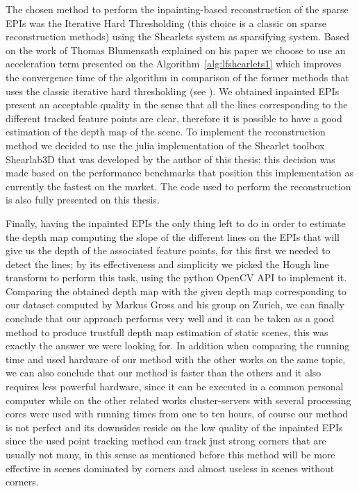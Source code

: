 \bigskip

The chosen method to perform the inpainting-based reconstruction of the sparse EPIs was the Iterative Hard Thresholding (this choice is a classic on sparse reconstruction methods) using the Shearlets system as sparsifying system. Based on the work of Thomas Blumensath explained on his paper \cite{hard-thresholding} we choose to use an acceleration term presented on the Algorithm~\ref{alg:lfshearlets1} which improves the convergence time of the algorithm in comparison of the former methods that uses the classic iterative hard thresholding (see \cite{clustered-inpainting}). We obtained inpainted EPIs present an acceptable quality in the sense that all the lines corresponding to the different tracked feature points are clear, therefore it is possible to have a good estimation of the depth map of the scene. To implement the reconstruction method we decided to use the julia implementation of the Shearlet toolbox Shearlab3D that was developed by the author of this thesis; this decision was made based on the performance benchmarks that position this implementation as currently the fastest on the market. The code used to perform the reconstruction is also fully presented on this thesis.

\bigskip

Finally, having the inpainted EPIs the only thing left to do in order to estimate the depth map computing the slope of the different lines on the EPIs that will give us the depth of the associated feature points, for this first we needed to detect the lines; by its effectiveness and simplicity we picked the Hough line transform to perform this task, using the python OpenCV API to implement it. Comparing the obtained depth map with the given depth map corresponding to our dataset computed by Markus Gross and his group on Zurich, we can finally conclude that our approach performs very well and it can be taken as a good method to produce trustfull depth map estimation of static scenes, this was exactly the answer we were looking for. In addition when comparing the running time and used hardware of our method with the other works on the same topic, we can also conclude that our method is faster than the others and it also requires less powerful hardware, since it can be executed in a common personal computer while on the other related works cluster-servers with several processing cores were used with running times from one to ten hours, of course our method is not perfect and its downsides reside on the low quality of the inpainted EPIs since the used point tracking method can track just strong corners that are usually not many, in this sense as mentioned before this method will be more effective in scenes dominated by corners and almost useless in scenes without corners.

